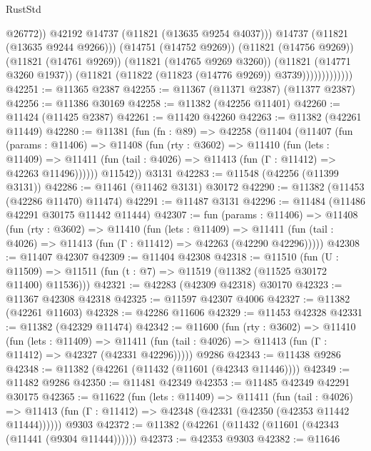 \begin{lexlean}{RustStd}
\begin{coremodule}
                                  @26772))
                              @42192
                              @14737
                              (@11821 (@13635 @9254 @4037)))
                            @14737
                            (@11821 (@13635 @9244 @9266)))
                          (@14751 (@14752 @9269))
                          (@11821 (@14756 @9269))
                          (@11821 (@14761 @9269))
                          (@11821 (@14765 @9269 @3260))
                          (@11821 (@14771 @3260 @1937))
                          (@11821 (@11822 (@11823 (@14776 @9269)) @3739)))))))))))))
@42251 := @11365 @2387
@42255 := @11367 (@11371 @2387) (@11377 @2387)
@42256 := @11386 @30169
@42258 := @11382 (@42256 @11401)
@42260 := @11424 (@11425 @2387)
@42261 := @11420 @42260
@42263 := @11382 (@42261 @11449)
@42280 := @11381
    (fun (fn : @89) =>
    @42258
      (@11404
        (@11407
          (fun (params : @11406) =>
          @11408
            (fun (rty : @3602) =>
            @11410
              (fun (lets : @11409) =>
              @11411 (fun (tail : @4026) => @11413 (fun (Γ : @11412) => @42263 @11496))))))
        @11542))
    @3131
@42283 := @11548 (@42256 (@11399 @3131))
@42286 := @11461 (@11462 @3131) @30172
@42290 := @11382 (@11453 (@42286 @11470) @11474)
@42291 := @11487 @3131
@42296 := @11484 (@11486 @42291 @30175 @11442 @11444)
@42307 := fun (params : @11406) =>
  @11408
    (fun (rty : @3602) =>
    @11410
      (fun (lets : @11409) =>
      @11411 (fun (tail : @4026) => @11413 (fun (Γ : @11412) => @42263 (@42290 @42296)))))
@42308 := @11407 @42307
@42309 := @11404 @42308
@42318 := @11510
    (fun (U : @11509) => @11511 (fun (t : @7) => @11519 (@11382 (@11525 @30172 @11400) @11536)))
@42321 := @42283 (@42309 @42318) @30170
@42323 := @11367 @42308 @42318
@42325 := @11597 @42307 @4006
@42327 := @11382 (@42261 @11603)
@42328 := @42286 @11606
@42329 := @11453 @42328
@42331 := @11382 (@42329 @11474)
@42342 := @11600
    (fun (rty : @3602) =>
    @11410
      (fun (lets : @11409) =>
      @11411 (fun (tail : @4026) => @11413 (fun (Γ : @11412) => @42327 (@42331 @42296)))))
    @9286
@42343 := @11438 @9286
@42348 := @11382 (@42261 (@11432 (@11601 (@42343 @11446))))
@42349 := @11482 @9286
@42350 := @11481 @42349
@42353 := @11485 @42349 @42291 @30175
@42365 := @11622
    (fun (lets : @11409) =>
    @11411
      (fun (tail : @4026) =>
      @11413 (fun (Γ : @11412) => @42348 (@42331 (@42350 (@42353 @11442 @11444))))))
    @9303
@42372 := @11382 (@42261 (@11432 (@11601 (@42343 (@11441 (@9304 @11444))))))
@42373 := @42353 @9303
@42382 := @11646

\end{coremodule}
\end{lexlean}
